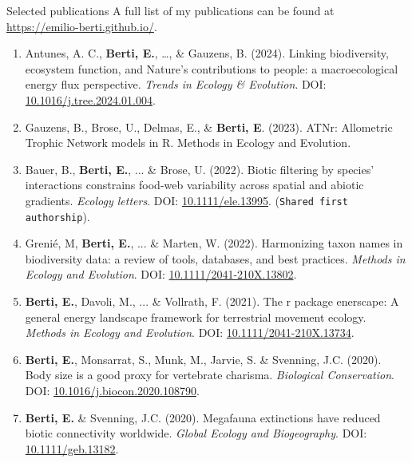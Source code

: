 \documentclass{resume} %
\begin{document}
\begin{rSection}{Selected publications}
A full list of my publications can be found at \url{https://emilio-berti.github.io/}.

\begin{enumerate}
    \setlength\itemsep{-0.5em}
    \item Antunes, A. C., \textbf{Berti, E.}, \dots, \& Gauzens, B. (2024). Linking biodiversity, ecosystem function, and Nature’s contributions to people: a macroecological energy flux perspective. \textit{Trends in Ecology \& Evolution}. DOI: \href{https://doi.org/10.1016/j.tree.2024.01.004}{10.1016/j.tree.2024.01.004}.
    \item Gauzens, B., Brose, U., Delmas, E., \& \textbf{Berti, E}. (2023). ATNr: Allometric Trophic Network models in R. Methods in Ecology and Evolution.
    \item Bauer, B., \textbf{Berti, E.}, ... \& Brose, U. (2022). Biotic filtering by species’ interactions constrains food-web variability across spatial and abiotic gradients. \textit{Ecology letters}. DOI: \href{https://doi.org/10.1111/ele.13995}{10.1111/ele.13995}. (\texttt{Shared first authorship}).
    \item Grenié, M, \textbf{Berti, E.}, ... \& Marten, W. (2022). Harmonizing taxon names in biodiversity data: a review of tools, databases, and best practices. \textit{Methods in Ecology and Evolution}. DOI: \href{https://doi.org/10.1111/2041-210X.13802}{10.1111/2041-210X.13802}.
    \item \textbf{Berti, E.}, Davoli, M., ... \& Vollrath, F. (2021). The r package enerscape: A general energy landscape framework for terrestrial movement ecology. \textit{Methods in Ecology and Evolution}. DOI: \href{https://doi.org/10.1111/2041-210X.13734}{10.1111/2041-210X.13734}.
    \item \textbf{Berti, E.}, Monsarrat, S., Munk, M., Jarvie, S. \& Svenning, J.C. (2020). Body size is a good proxy for vertebrate charisma. \textit{Biological Conservation}. DOI: \href{https://doi.org/10.1016/j.biocon.2020.108790}{10.1016/j.biocon.2020.108790}.
    \item \textbf{Berti, E.} \& Svenning, J.C. (2020). Megafauna extinctions have reduced biotic connectivity worldwide. \textit{Global Ecology and Biogeography}. DOI: \href{https://doi.org/10.1111/geb.13182}{10.1111/geb.13182}.
\end{enumerate}
\end{rSection}
\end{document}
